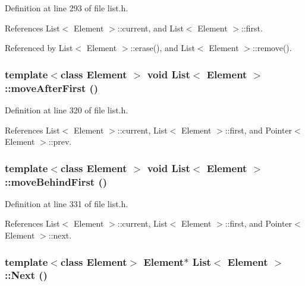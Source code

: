 Definition at line 293 of file list.h.

References List$<$ Element $>$::current, and List$<$ Element $>$::first.

Referenced by List$<$ Element $>$::erase(), and List$<$ Element $>$::remove().\hypertarget{classList_65b63c90e638ab1fe2345bfbbd259a1c}{
\subsubsection[{moveAfterFirst}]{\setlength{\rightskip}{0pt plus 5cm}template$<$class Element $>$ void {\bf List}$<$ Element $>$::moveAfterFirst ()}}
\label{classList_65b63c90e638ab1fe2345bfbbd259a1c}




Definition at line 320 of file list.h.

References List$<$ Element $>$::current, List$<$ Element $>$::first, and Pointer$<$ Element $>$::prev.\hypertarget{classList_fcf5aaa43e909b0a83d84ba8ffc763b2}{
\subsubsection[{moveBehindFirst}]{\setlength{\rightskip}{0pt plus 5cm}template$<$class Element $>$ void {\bf List}$<$ Element $>$::moveBehindFirst ()}}
\label{classList_fcf5aaa43e909b0a83d84ba8ffc763b2}




Definition at line 331 of file list.h.

References List$<$ Element $>$::current, List$<$ Element $>$::first, and Pointer$<$ Element $>$::next.\hypertarget{classList_9427eb3a61700d4271ff0c2462b8d1ec}{
\subsubsection[{Next}]{\setlength{\rightskip}{0pt plus 5cm}template$<$class Element$>$ Element$\ast$ {\bf List}$<$ Element $>$::Next ()}}
\label{classList_9427eb3a61700d4271ff0c2462b8d1ec}




